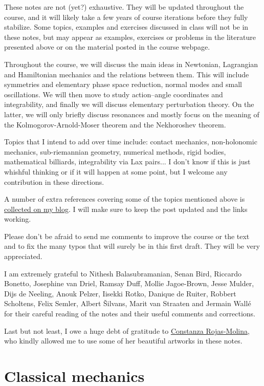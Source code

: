 \documentclass[english,fontsize=11pt,paper=b5]{scrbook}
\theoremstyle{definition}
\begin{document}
  These notes are not (yet?) exhaustive.
  They will be updated throughout the course, and it will likely take a few years of course iterations before they fully stabilize.
  Some topics, examples and exercises discussed in class will not be in these notes, but may appear as examples, exercises or problems in the literature presented above or on the material posted in the course webpage.

  Throughout the course, we will discuss the main ideas in Newtonian, Lagrangian and Hamiltonian mechanics and the relations between them.
  This will include symmetries and elementary phase space reduction, normal modes and small oscillations.
  We will then move to study action--angle coordinates and integrability, and finally we will discuss elementary perturbation theory.
  On the latter, we will only briefly discuss resonances and mostly focus on the meaning of the Kolmogorov-Arnold-Moser theorem and the Nekhoroshev theorem.

  Topics that I intend to add over time include: contact mechanics, non-holonomic mechanics, sub-riemannian geometry, numerical methods, rigid bodies, mathematical billiards, integrability via Lax pairs... I don't know if this is just whishful thinking or if it will happen at some point, but I welcome any contribution in these directions.

  A number of extra references covering some of the topics mentioned above is \href{https://www.mseri.me/links-from-hm/}{collected on my blog}. I will make sure to keep the post updated and the links working. \medskip

  Please don't be afraid to send me comments to improve the course or the text and to fix the many typos that will surely be in this first draft. They will be very appreciated.

  I am extremely grateful to Nithesh Balasubramanian, Senan Bird, Riccardo Bonetto, Jose\-phine van Driel, Ramsay Duff, Mollie Jagoe-Brown, Jesse Mulder, Dijs de Neeling, Anouk Pelzer, Iisekki Rotko, Danique de Ruiter, Robbert Scholtens, Felix Semler, Albert \v{S}ilvans, Marit van Straaten and Jermain Wall\'e for their careful reading of the notes and their useful comments and corrections.

  Last but not least, I owe a huge debt of gratitude to \href{https://crojasmolina.com}{Constanza Rojas-Molina}, who kindly allowed me to use some of her beautiful artworks in these notes.

  \chapter{Classical mechanics}
\end{document}
